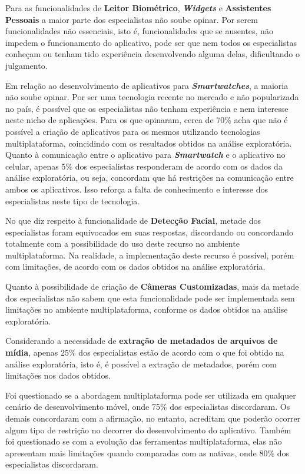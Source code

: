 Para as funcionalidades de \textbf{Leitor Biométrico}, \textbf{\textit{Widgets}} e \textbf{Assistentes Pessoais} a maior parte dos especialistas não soube opinar. Por serem funcionalidades não essenciais, isto é, 
funcionalidades que se ausentes, não impedem o funcionamento do aplicativo, pode ser que nem todos os especialistas conheçam ou tenham tido experiência desenvolvendo alguma delas, dificultando o julgamento. 

Em relação ao desenvolvimento de aplicativos para \textbf{\textit{Smartwatches}}, a maioria não soube opinar. Por ser uma tecnologia recente no mercado e não popularizada no país, é possível que os especialistas não 
tenham experiência e nem interesse neste nicho de aplicações. Para os que opinaram, cerca de 70\% acha que não é possível a criação de aplicativos para os mesmos utilizando tecnologias multiplataforma, coincidindo com 
os resultados obtidos na análise exploratória. Quanto à comunicação entre o aplicativo para \textbf{\textit{Smartwatch}} e o aplicativo no celular, apenas 5\% dos especialistas responderam de acordo com os dados da análise 
exploratória, ou seja, concordam que há restrições na comunicação entre ambos os aplicativos. Isso reforça a falta de conhecimento e interesse dos especialistas neste tipo de tecnologia.

No que diz respeito à funcionalidade de \textbf{Detecção Facial}, metade dos especialistas foram equivocados em suas respostas, discordando ou concordando totalmente com a possibilidade do uso deste recurso no ambiente 
multiplataforma. Na realidade, a implementação deste recurso é possível, porém com limitações, de acordo com os dados obtidos na análise exploratória.  

Quanto à possibilidade de criação de \textbf{Câmeras Customizadas}, mais da metade dos especialistas não sabem que esta funcionalidade pode ser implementada sem limitações no ambiente multiplataforma, conforme os dados 
obtidos na análise exploratória.

Considerando a necessidade de \textbf{extração de metadados de arquivos de mídia}, apenas 25\% dos especialistas estão de acordo com o que foi obtido na análise exploratória, isto é, é possível a extração de metadados, porém
com limitações nos dados obtidos.

Foi questionado se a abordagem multiplataforma pode ser utilizada em qualquer cenário de desenvolvimento móvel, onde 75\% dos especialistas discordaram. Os demais concordaram com a afirmação, no entanto, acreditam que 
poderão ocorrer algum tipo de restrição no decorrer do desenvolvimento do aplicativo. Também foi questionado se com a evolução das ferramentas multiplataforma, elas não apresentam mais limitações quando comparadas com as 
nativas, onde 80\% dos especialistas discordaram.

